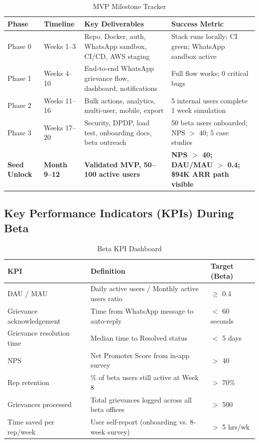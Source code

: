 \documentclass[12pt, a4paper]{article}
\begin{document}
\begin{table}[ht]
\centering
\caption{MVP Milestone Tracker}
\renewcommand{\arraystretch}{1.4}
\begin{tabularx}{\textwidth}{p{2.2cm} p{3cm} X p{3cm}}
\toprule
\rowcolor{pollitylightblue}
\textbf{Phase} & \textbf{Timeline} & \textbf{Key Deliverables} & \textbf{Success Metric} \\
\midrule
Phase 0 & Weeks 1--3   & Repo, Docker, auth, WhatsApp sandbox, CI/CD, AWS staging & Stack runs locally; CI green; WhatsApp sandbox active \\
\midrule
Phase 1 & Weeks 4--10  & End-to-end WhatsApp grievance flow, dashboard, notifications & Full flow works; 0 critical bugs \\
\midrule
Phase 2 & Weeks 11--16 & Bulk actions, analytics, multi-user, mobile, export & 5 internal users complete 1 week simulation \\
\midrule
Phase 3 & Weeks 17--20 & Security, DPDP, load test, onboarding docs, beta outreach & 50 beta users onboarded; NPS $>$ 40; 5 case studies \\
\midrule
\rowcolor{pollitylightblue}
\textbf{Seed Unlock} & \textbf{Month 9--12} & \textbf{Validated MVP, 50--100 active users} & \textbf{NPS $>$ 40; DAU/MAU $>$ 0.4; \$94K ARR path visible} \\
\bottomrule
\end{tabularx}
\end{table}

\vspace{1em}

\subsection{Key Performance Indicators (KPIs) During Beta}

\begin{table}[ht]
\centering
\caption{Beta KPI Dashboard}
\renewcommand{\arraystretch}{1.3}
\begin{tabularx}{\textwidth}{l X p{3.5cm}}
\toprule
\rowcolor{pollitylightblue}
\textbf{KPI} & \textbf{Definition} & \textbf{Target (Beta)} \\
\midrule
DAU / MAU                  & Daily active users / Monthly active users ratio & $\geq$ 0.4 \\
Grievance acknowledgement  & Time from WhatsApp message to auto-reply & $<$ 60 seconds \\
Grievance resolution time  & Median time to Resolved status & $<$ 5 days \\
NPS                        & Net Promoter Score from in-app survey & $>$ 40 \\
Rep retention              & \% of beta users still active at Week 8 & $>$ 70\% \\
Grievances processed       & Total grievances logged across all beta offices & $>$ 500 \\
Time saved per rep/week    & User self-report (onboarding vs. 8-week survey) & $>$ 5 hrs/wk \\
\bottomrule
\end{tabularx}
\end{table}
\end{document}
